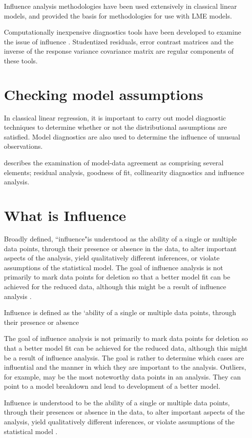 \documentclass[12pt, a4paper]{article}
\begin{document}
Influence analysis methodologies have been used extensively in classical linear models, and provided the basis for methodologies for use with LME models.

Computationally inexpensive diagnostics tools have been developed to examine the issue of influence \citep{tewomir}.
Studentized residuals, error contrast matrices and the inverse of the response variance covariance matrix are regular components of these tools.
\section{Checking model assumptions}
In classical linear regression, it is important to carry out model diagnostic techniques to determine whether or not the distributional assumptions are satisfied. Model diagnostics are also used to determine the influence of unusual observations.

\citet{schabenberger} describes the examination of model-data agreement as comprising several elements; residual analysis, goodness of fit, collinearity diagnostics and influence analysis.
\section{What is Influence} %

Broadly defined, ``influence"is understood as the ability of a single or multiple data points, through their presence or absence in the data, to alter important aspects of the analysis, yield qualitatively different inferences, or violate assumptions of the statistical model. The goal of influence analysis is not primarily to mark data points for deletion so that a better model fit can be achieved for the reduced data, although this might be a result of influence analysis \citep{schabenberger}.

Influence is defined as the `ability of a single or multiple data points, through their presence or absence
	
			
The goal of influence analysis is not primarily to mark data points for deletion so that a better model fit can be achieved for the reduced data, although this might be a result of influence analysis. The goal is rather to determine which cases are influential and the manner in which they are important to the analysis. Outliers, for example, may be the most noteworthy data points in an analysis. They can point to a model breakdown and lead to development of a better model.

Influence is understood to be the ability of a single or multiple data points, through their presences or absence in the data, to
alter important aspects of the analysis, yield qualitatively different inferences, or violate assumptions of the statistical
model \citep{schabenberger}.
\end{document}
